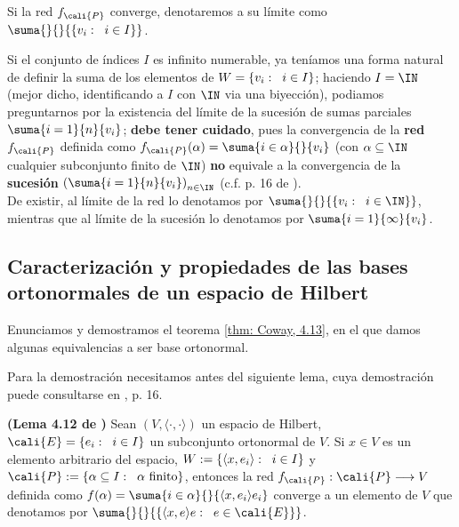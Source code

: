 \begin{notacion}
Si la red $f_{\cali{P}}$ converge,
denotaremos a su límite como
$\suma{}{}{\{ v_{i}: \hspace{0.2cm} i \in I \}}$.
\end{notacion}

\begin{nota}
Si el conjunto de índices $I$ es infinito numerable, ya 
teníamos una forma natural de definir la suma 
de los elementos de $W = \{ v_{i}: \hspace{0.2cm} i \in I \}$;
haciendo $I = \IN$ (mejor dicho, identificando a $I$ con 
$\IN$ via una biyección), podiamos preguntarnos por la existencia
del límite de la sucesión de sumas parciales
$\suma{i=1}{n}{v_{i}}$; \textbf{debe tener cuidado}, pues
la convergencia de la \textbf{red} $f_{\cali{P}}$ definida como 
$f_{\cali{P}}(\alpha) = \suma{i \in \alpha}{}{v_{i}}$ 
(con $\alpha \subseteq \IN$ cualquier subconjunto finito de $\IN$)
\textbf{no}
equivale a la convergencia de la \textbf{sucesión}
$\left( \suma{i=1}{n}{v_{i}} \right)_{n \in \IN}$
(c.f. p. 16 de \cite{conway}). \\
De existir, al límite de la red lo denotamos por
$\suma{}{}{\{ v_{i} : \hspace{0.2cm} i \in \IN \}}$, mientras
que al límite de la sucesión lo denotamos por
$\suma{i=1}{\infty}{v_{i}}$.
\end{nota} 


\subsection{Caracterización y propiedades de las bases ortonormales de un espacio de Hilbert}


Enunciamos y demostramos el teorema
\ref{thm: Coway, 4.13}, en el que damos algunas equivalencias
a ser base ortonormal.

Para la demostración necesitamos antes del siguiente lema,
cuya demostración puede consultarse en \cite{conway}, p. 16.

\begin{lema}
\label{lema: 4.12 conway}
\textbf{(Lema 4.12 de \cite{conway})}
Sean $(V, \langle \cdot , \cdot \rangle)$ un espacio
de Hilbert, $\cali{E}= \{e_{i}: \hspace{0.2cm} i \in I \}$ 
un subconjunto ortonormal de
$V$. Si $x \in V$ es un elemento arbitrario del espacio,
$W := \{ \langle x, e_{i} \rangle:\hspace{0.2cm} i \in I \}$
y $\cali{P}:= \{ \alpha \subseteq I: \hspace{0.2cm} \alpha \text{ finito} \}$,
entonces la red
$f_{\cali{P}}: \cali{P} \longrightarrow V$ 
definida como $f(\alpha) = \suma{i \in \alpha}{}{\langle x, e_{i} \rangle e_{i}}$
converge a un elemento de $V$ que denotamos por 
$\suma{}{}{ \{ \langle x, e \rangle e: \hspace{0.2cm} e \in \cali{E} \} }$.
\end{lema}




